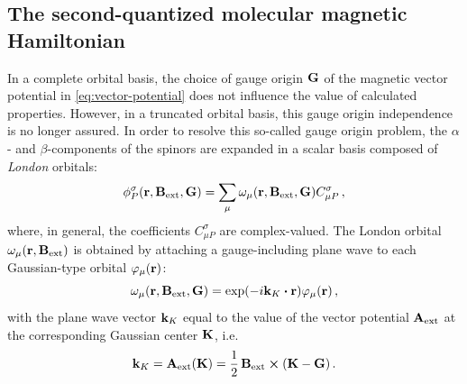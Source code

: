 \documentclass[journal=jctc,manuscript=article]{achemso}
\begin{document}
    \subsection{The second-quantized molecular magnetic Hamiltonian} \label{sec:theory-sq-molecular}
        In a complete orbital basis, the choice of gauge origin $\vb{G}$ of the magnetic vector potential in \cref{eq:vector-potential} does not influence the value of calculated properties.
        However, in a truncated orbital basis, this gauge origin independence is no longer assured.\cite{Helgaker.1991}
        In order to resolve this so-called gauge origin problem, the $\alpha$- and $\beta$-components of the spinors are expanded in a scalar basis composed of \emph{London} orbitals: \cite{London.1937, Ditchfield.1972, Helgaker.1991, Helgaker.2012}
        \begin{equation}
            \phi_P^{\sigma}(\vb{r}, \vb{B}_{\text{ext}}, \vb{G})
            = \sum_{\mu}
                \omega_{\mu}(\vb{r}, \vb{B}_{\text{ext}}, \vb{G})
                C_{\mu P}^\sigma
            \thinspace ,
        \end{equation}
        where, in general, the coefficients $C_{\mu P}^\sigma$ are complex-valued.
        The London orbital $\omega_{\mu}(\vb{r}, \vb{B}_{\text{ext}})$ is obtained by attaching a gauge-including plane wave to each Gaussian-type orbital $\varphi_{\mu}(\vb{r})$:
        \begin{equation}
            \omega_{\mu}(\vb{r}, \vb{B}_{\text{ext}}, \vb{G})
            = \exp(-i \vb{k}_K \vdot \vb{r})
                \varphi_{\mu}(\vb{r})
            \thinspace ,
        \end{equation}
        with the plane wave vector $\vb{k}_K$ equal to the value of the vector potential $\vb{A}_{\text{ext}}$ at the corresponding Gaussian center $\vb{K}$, i.e.
        \begin{equation}
            \vb{k}_K
            =
            \vb{A}_{\text{ext}}(\vb{K})
            = \frac{1}{2} \thinspace
                \vb{B}_{\text{ext}} \cross (\vb{K} - \vb{G})
            \thinspace .
        \end{equation}
\end{document}
